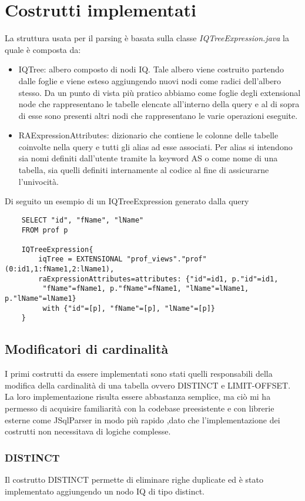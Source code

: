\section{Costrutti implementati}
\label{sec:implementation}
La struttura usata per il parsing è basata sulla classe \textit{IQTreeExpression.java} la quale è composta da:
\begin{itemize}
    \item IQTree: albero composto di nodi IQ. Tale albero viene costruito partendo dalle foglie e viene esteso aggiungendo nuovi nodi come radici dell'albero stesso. Da un punto di vista
          più pratico abbiamo come foglie degli extensional node che rappresentano le tabelle elencate all'interno della query e al di sopra di esse sono presenti altri nodi che
          rappresentano le varie operazioni eseguite.
    \item RAExpressionAttributes: dizionario che contiene le colonne delle tabelle coinvolte nella query e tutti gli alias ad esse associati. Per alias si intendono sia nomi definiti
          dall'utente tramite la keyword AS o come nome di una tabella, sia quelli definiti internamente al codice al fine di assicurarne l'univocità.
\end{itemize}
Di seguito un esempio di un IQTreeExpression generato dalla query
\begin{verbatim}
    SELECT "id", "fName", "lName"
    FROM prof p

    IQTreeExpression{
        iqTree = EXTENSIONAL "prof_views"."prof"(0:id1,1:fName1,2:lName1), 
        raExpressionAttributes=attributes: {"id"=id1, p."id"=id1, 
         "fName"=fName1, p."fName"=fName1, "lName"=lName1, p."lName"=lName1} 
         with {"id"=[p], "fName"=[p], "lName"=[p]}
    } 
    \end{verbatim}

\subsection{Modificatori di cardinalità}
I primi costrutti da essere implementati sono stati quelli responsabili della modifica della cardinalità di una tabella ovvero DISTINCT e LIMIT-OFFSET. La loro implementazione
risulta essere abbastanza semplice, ma ciò mi ha permesso di acquisire familiarità con la codebase preesistente e con librerie esterne come JSqlParser
in modo più rapido ,dato che l'implementazione dei costrutti non necessitava di logiche complesse.

\subsubsection*{DISTINCT}
Il costrutto DISTINCT permette di eliminare righe duplicate ed è stato implementato aggiungendo un nodo IQ di tipo distinct.

